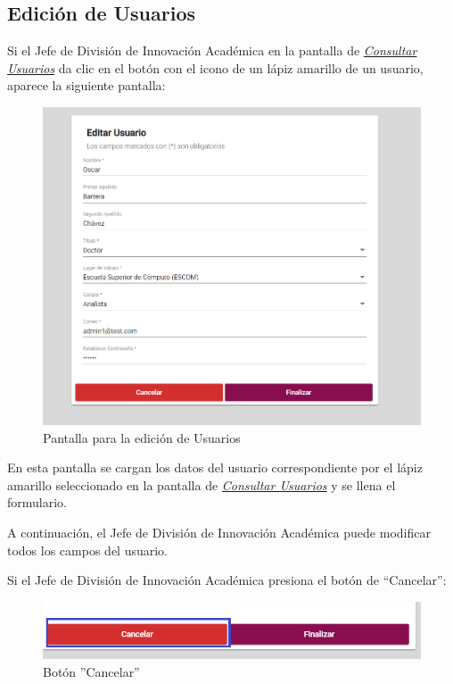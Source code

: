 \newpage

\hypertarget{editar-user}{}
\subsection{Edición de Usuarios}
Si el Jefe de División de Innovación Académica  en la pantalla de \hyperlink{consultarUs}{\textit{Consultar Usuarios}} da clic en el botón con el icono de un lápiz amarillo de un usuario, aparece la siguiente pantalla:

\begin{figure}[H]
	\centering
	\hypertarget{editarUs}{\includegraphics[width=0.6\linewidth]{images/SP5/Editar-Usuario}}
	\caption{Pantalla para la edición de Usuarios}
	\label{editarrh}
\end{figure}

En esta pantalla se cargan los datos del usuario correspondiente por el lápiz amarillo seleccionado en la pantalla de \hyperlink{consultarUs}{\textit{Consultar Usuarios}} y se llena el formulario.

A continuación, el Jefe de División de Innovación Académica  puede modificar todos los campos del usuario.

Si el Jefe de División de Innovación Académica  presiona el botón de “Cancelar”:

\begin{figure}[H]
	\centering
	\hypertarget{cancel2}{\includegraphics[width=0.7\linewidth]{images/SP5/BtnCancelar2}}
	\caption{Botón ''Cancelar''}
	\label{cancel2}
\end{figure}

